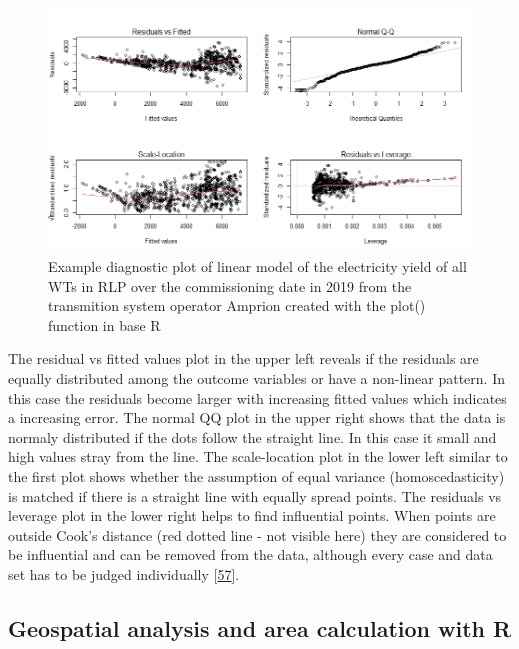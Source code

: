 \documentclass[a4paper,11pt]{article}
\begin{document}
\begin{figure}[H]

{\centering \includegraphics[width=1\linewidth]{figures/diagnostics} 

}

\caption{Example diagnostic plot of linear model of the electricity yield of all WTs in RLP over the commissioning date in 2019 from the transmition system operator Amprion created with the plot() function in base R}\label{fig:diagnostics}
\end{figure}
The residual vs fitted values plot in the upper left reveals if the residuals are equally distributed among the outcome variables or have a non-linear pattern. In this case the residuals become larger with increasing fitted values which indicates a increasing error. The normal QQ plot in the upper right shows that the data is normaly distributed if the dots follow the straight line. In this case it small and high values stray from the line. The scale-location plot in the lower left similar to the first plot shows whether the assumption of equal variance (homoscedasticity) is matched if there is a straight line with equally spread points. The residuals vs leverage plot in the lower right helps to find influential points. When points are outside Cook's distance (red dotted line - not visible here) they are considered to be influential and can be removed from the data, although every case and data set has to be judged individually {[}\protect\hyperlink{ref-BommaeKim.2015}{57}{]}.

\hypertarget{geospatial-analysis-and-area-calculation-with-r}{%
\subsection{Geospatial analysis and area calculation with R}\label{geospatial-analysis-and-area-calculation-with-r}}
\end{document}
